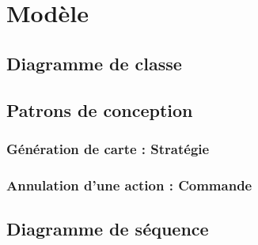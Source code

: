 \section{Modèle}

\subsection{Diagramme de classe}

\subsection{Patrons de conception}
\subsubsection{Génération de carte : Stratégie}
\subsubsection{Annulation d'une action : Commande}

\subsection{Diagramme de séquence}
